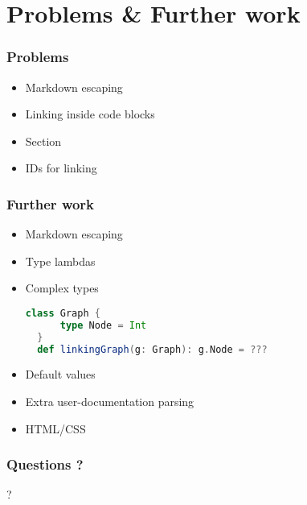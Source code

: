 \documentclass{beamer}
\begin{document}
\section{Problems \& Further work}

\begin{frame}
  \frametitle{Problems}
  \begin{itemize}
    \item Markdown escaping \pause
    \item Linking inside code blocks \pause
    \item Section \pause
    \item IDs for linking
  \end{itemize}
\end{frame}

\begin{frame}[fragile]
  \frametitle{Further work}
  \begin{itemize}
    \item Markdown escaping \pause
    \item Type lambdas \pause
    \item Complex types
\begin{lstlisting}[language=scala]
  class Graph {
      type Node = Int
  }
  def linkingGraph(g: Graph): g.Node = ???    
\end{lstlisting}\pause
    \item Default values \pause
    \item Extra user-documentation parsing \pause
    \item HTML/CSS
  \end{itemize}
\end{frame}

\begin{frame}
  \frametitle{Questions ?}
  \begin{center}
    \Huge{?}
  \end{center}
\end{frame}
\end{document}
